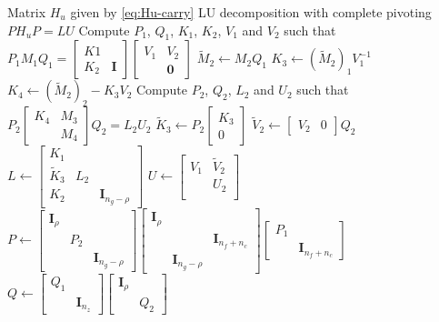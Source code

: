 \documentclass{article}
\begin{document}
\begin{algorithm}
    \caption{Blocked LU decomposition of lower triangular matrix $H_u$ with carry-over}
    \label{alg:blocked-lu-carry}
    \begin{algorithmic}
    \Require Matrix $H_u$ given by \eqref{eq:Hu-carry}
    \Ensure LU decomposition with complete pivoting $P H_u P = L U$
    \State Compute $P_1$, $Q_1$, $K_1$, $K_2$, $V_1$ and $V_2$ such that $P_1 M_1 Q_1 = \begin{bmatrix}K1 & \\ K_2 & \bm{I}\end{bmatrix} \begin{bmatrix} V_1 & V_2\\ & \bm{0}\end{bmatrix}$
    \State $\tilde{M}_2 \gets M_2 Q_1$
    \State $K_3 \gets (\tilde{M}_2)_1 V_1^{-1}$
    \State $K_4 \gets (\tilde{M}_2)_2 - K_3 V_2$
    \State Compute $P_2$, $Q_2$, $L_2$ and $U_2$ such that $P_2 \begin{bmatrix} K_4 & M_3\\ & M_4 \end{bmatrix} Q_2 = L_2 U_2$
    \State $\tilde{K}_3 \gets P_2 \begin{bmatrix} K_3\\ 0 \end{bmatrix}$
    \State $\tilde{V}_2 \gets \begin{bmatrix} V_2 & 0 \end{bmatrix} Q_2$
    \State $L \gets \begin{bmatrix} K_1 & & \\ \tilde{K}_3 & L_2 & \\ K_2 &  & \bm{I}_{n_g-\rho} \end{bmatrix}$
    \State $U \gets \begin{bmatrix} V_1 & \tilde{V}_2\\ & U_2\\ & \end{bmatrix}$
    \State $P \gets \begin{bmatrix} \bm{I}_\rho & & \\ & P_2 & \\ & & \bm{I}_{n_g-\rho} \end{bmatrix} \begin{bmatrix} \bm{I}_\rho & & \\ & & \bm{I}_{n_f+n_c} \\ & \bm{I}_{n_g-\rho} & \end{bmatrix} \begin{bmatrix} P_1 & \\ & \bm{I}_{n_f+n_c} \end{bmatrix}$
    \State $Q \gets \begin{bmatrix} Q_1 & \\ & \bm{I}_{n_z}\end{bmatrix} \begin{bmatrix}\bm{I}_\rho &\\ & Q_2 \end{bmatrix}$

    \end{algorithmic}
\end{algorithm}
\end{document}
